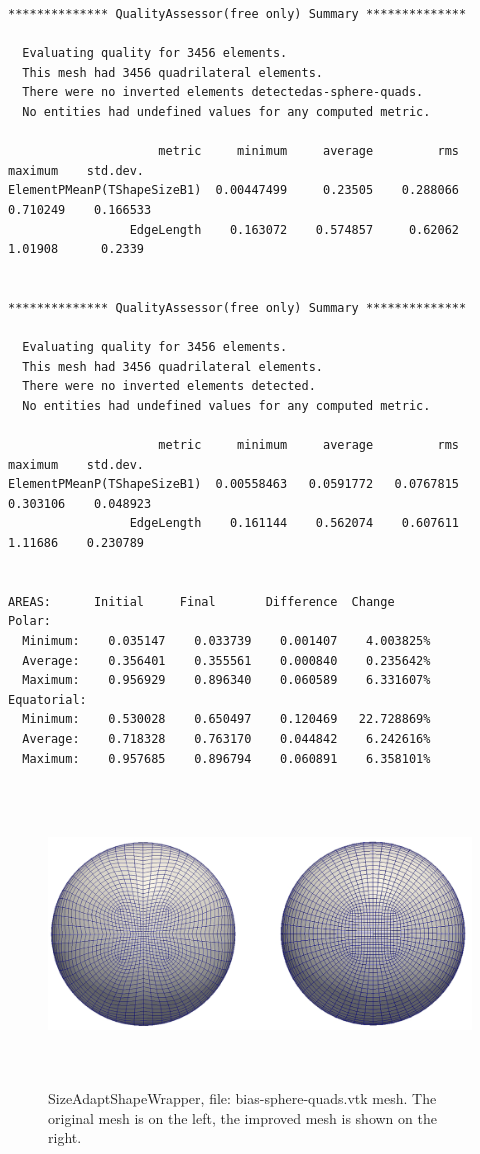 \begin{verbatim}
************** QualityAssessor(free only) Summary **************

  Evaluating quality for 3456 elements.
  This mesh had 3456 quadrilateral elements.
  There were no inverted elements detectedas-sphere-quads. 
  No entities had undefined values for any computed metric.

                     metric     minimum     average         rms     maximum    std.dev.
ElementPMeanP(TShapeSizeB1)  0.00447499     0.23505    0.288066    0.710249    0.166533
                 EdgeLength    0.163072    0.574857     0.62062     1.01908      0.2339


************** QualityAssessor(free only) Summary **************

  Evaluating quality for 3456 elements.
  This mesh had 3456 quadrilateral elements.
  There were no inverted elements detected. 
  No entities had undefined values for any computed metric.

                     metric     minimum     average         rms     maximum    std.dev.
ElementPMeanP(TShapeSizeB1)  0.00558463   0.0591772   0.0767815    0.303106    0.048923
                 EdgeLength    0.161144    0.562074    0.607611     1.11686    0.230789


AREAS:      Initial     Final       Difference  Change
Polar:
  Minimum:    0.035147    0.033739    0.001407    4.003825%
  Average:    0.356401    0.355561    0.000840    0.235642%
  Maximum:    0.956929    0.896340    0.060589    6.331607%
Equatorial:
  Minimum:    0.530028    0.650497    0.120469   22.728869%
  Average:    0.718328    0.763170    0.044842    6.242616%
  Maximum:    0.957685    0.896794    0.060891    6.358101%
\end{verbatim}


\begin{figure}[htbp]
\begin{center}
    \includegraphics[height=80mm]{bias-sphere-quads.eps}
    \caption{SizeAdaptShapeWrapper, file: bias-sphere-quads.vtk mesh. The original mesh is on the left, the improved mesh is shown on the right.}
    \label{fig:shest_grid32}
\end{center}
\end{figure}


